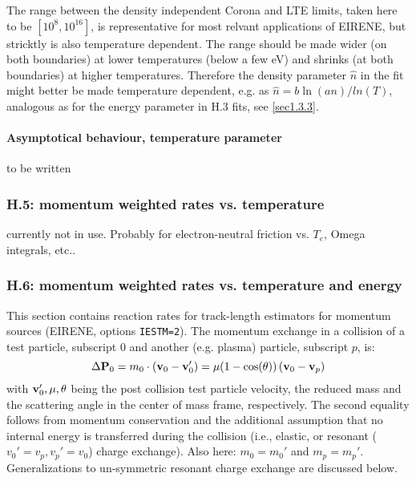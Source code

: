 \documentclass[12pt,dvipdfmx]{article}
\begin{document}
The range between the density independent Corona and LTE limits, taken here to be
$[10^8 ,10^{16}]$,  is representative for most relvant applications of EIRENE, but stricktly is also temperature dependent.
The range should be made wider (on both boundaries) at lower temperatures (below a few eV)  and shrinks
(at both boundaries) at higher temperatures. Therefore the density parameter $\hat n$ in the fit might better be made
temperature dependent, e.g. as $\hat n = b \ln(a n)/ln(T)$, analogous as for the energy parameter in H.3 fits, see \ref{sec1.3.3}.

\paragraph{Asymptotical behaviour, temperature parameter}
to be written

\subsubsection{H.5: momentum weighted rates vs. temperature}\label{sec1.3.5}
currently not in use. Probably for electron-neutral friction vs. $T_e$, Omega integrals, etc..

\subsubsection{H.6: momentum weighted rates vs. temperature and energy}\label{sec1.3.6}
This section  contains reaction rates for track-length estimators for momentum sources (EIRENE, options {\tt IESTM=2}).
The momentum exchange in a collision of a test particle, subscript $0$ and another (e.g. plasma) particle, subscript $p$,
is:
\begin{equation}
\Delta {\bf P}_0 = m_0 \cdot \left({\bf v}_0-{\bf v}'_0\right) = \mu (1-\cos(\theta)) \left({\bf v}_0-{\bf v}_p\right)
\end{equation}
with ${\bf v}_0', \mu, \theta$ being the post collision test particle velocity,
the reduced mass and the scattering angle in the center of mass frame, respectively.
The second equality follows from momentum conservation
and the additional assumption that no internal energy is transferred during
the collision (i.e., elastic, or resonant ($v_0'=v_p , v_p'=v_0$) charge exchange). Also here:  $m_0 = m_0'$ and $m_p = m_p'$. Generalizations to un-symmetric
resonant charge exchange are discussed below.
\end{document}
